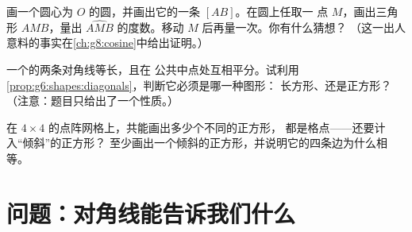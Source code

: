 \begin{exercise}[$\star\star$]\label{exo:g6:shapes:10}
画一个圆心为 $O$ 的圆，并画出它的一条 $[AB]$。在圆上任取一
点 $M$，画出三角形 $AMB$，量出
$\widehat{AMB}$ 的度数。移动 $M$ 后再量一次。你有什么猜想？
（这一出人意料的事实在\cref{ch:g8:cosine}中给出证明。）
\end{exercise}

\begin{exercise}[$\star\star$]\label{exo:g6:shapes:11}
一个的两条对角线等长，且在
公共中点处互相平分。试利用\cref{prop:g6:shapes:diagonals}，判断它必须是哪一种图形：
长方形、还是正方形？
（注意：题目只给出了一个性质。）
\end{exercise}

\begin{exercise}[$\star\star\star$]\label{exo:g6:shapes:12}
在 $4 \times 4$ 的点阵网格上，共能画出多少个不同的正方形，
都是格点——还要计入“倾斜”的正方形？
至少画出一个倾斜的正方形，并说明它的四条边为什么相等。
\end{exercise}

\section{问题：对角线能告诉我们什么}

